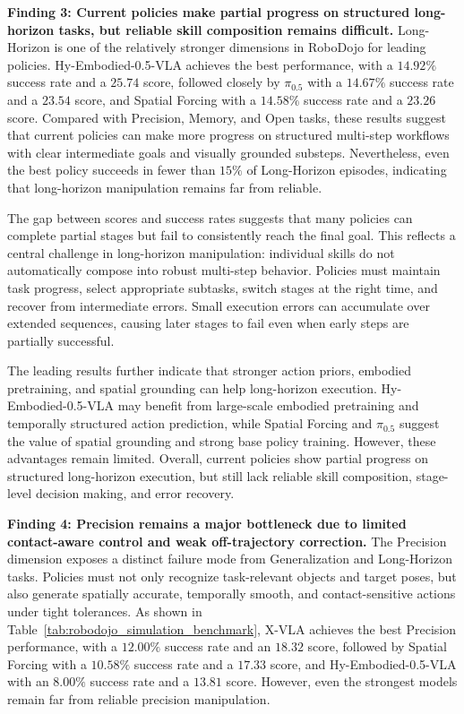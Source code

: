 \textcolor{Blue_1}{\textbf{Finding 3: Current policies make partial progress on structured long-horizon tasks, but reliable skill composition remains difficult.}}
Long-Horizon is one of the relatively stronger dimensions in RoboDojo for leading policies. Hy-Embodied-0.5-VLA achieves the best performance, with a $14.92\%$ success rate and a $25.74$ score, followed closely by $\pi_{0.5}$ with a $14.67\%$ success rate and a $23.54$ score, and Spatial Forcing with a $14.58\%$ success rate and a $23.26$ score. Compared with Precision, Memory, and Open tasks, these results suggest that current policies can make more progress on structured multi-step workflows with clear intermediate goals and visually grounded substeps. Nevertheless, even the best policy succeeds in fewer than $15\%$ of Long-Horizon episodes, indicating that long-horizon manipulation remains far from reliable.

The gap between scores and success rates suggests that many policies can complete partial stages but fail to consistently reach the final goal. This reflects a central challenge in long-horizon manipulation: individual skills do not automatically compose into robust multi-step behavior. Policies must maintain task progress, select appropriate subtasks, switch stages at the right time, and recover from intermediate errors. Small execution errors can accumulate over extended sequences, causing later stages to fail even when early steps are partially successful.

The leading results further indicate that stronger action priors, embodied pretraining, and spatial grounding can help long-horizon execution. Hy-Embodied-0.5-VLA may benefit from large-scale embodied pretraining and temporally structured action prediction, while Spatial Forcing and $\pi_{0.5}$ suggest the value of spatial grounding and strong base policy training. However, these advantages remain limited. Overall, current policies show partial progress on structured long-horizon execution, but still lack reliable skill composition, stage-level decision making, and error recovery.

\textcolor{Blue_1}{\textbf{Finding 4: Precision remains a major bottleneck due to limited contact-aware control and weak off-trajectory correction.}}
The Precision dimension exposes a distinct failure mode from Generalization and Long-Horizon tasks. Policies must not only recognize task-relevant objects and target poses, but also generate spatially accurate, temporally smooth, and contact-sensitive actions under tight tolerances. As shown in Table~\ref{tab:robodojo_simulation_benchmark}, X-VLA achieves the best Precision performance, with a $12.00\%$ success rate and an $18.32$ score, followed by Spatial Forcing with a $10.58\%$ success rate and a $17.33$ score, and Hy-Embodied-0.5-VLA with an $8.00\%$ success rate and a $13.81$ score. However, even the strongest models remain far from reliable precision manipulation.

